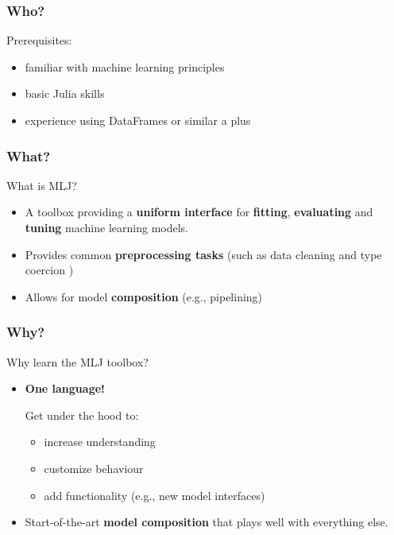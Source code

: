\documentclass[t]{beamer}
\newcommand\df{\bf\color{Maroon}}
\begin{document}
\begin{frame}
  \frametitle{Who?}
  \begin{block}{Prerequisites:}\pause
    \begin{itemize}
    \item familiar with machine learning principles
    \item basic Julia skills
    \item experience using DataFrames or similar a plus 
    \end{itemize}
  \end{block}
\end{frame}

\begin{frame}
  \frametitle{What?}
  \begin{block}{What is MLJ?}\pause
     \begin{itemize}
     \item A toolbox providing a {\df uniform interface} for {\df fitting}, {\df
         evaluating} and {\df tuning} machine learning models. 
          \item Provides common {\df preprocessing tasks} (such as data cleaning
            and type coercion )
          \item Allows for model {\df composition} (e.g., pipelining)
      \end{itemize}
    \end{block}
\end{frame}

\begin{frame}
  \frametitle{Why?}
  \begin{block}{Why learn the MLJ toolbox?}
    \begin{itemize}
    \item {\df One language!}\pause

      Get under the hood to:
      \begin{itemize}
      \item increase understanding
      \item customize behaviour
      \item add functionality (e.g., new model interfaces)\pause
      \end{itemize}
    \item Start-of-the-art {\df model composition} that plays well with everything else.
    \end{itemize}
  \end{block}
\end{frame}
\end{document}
